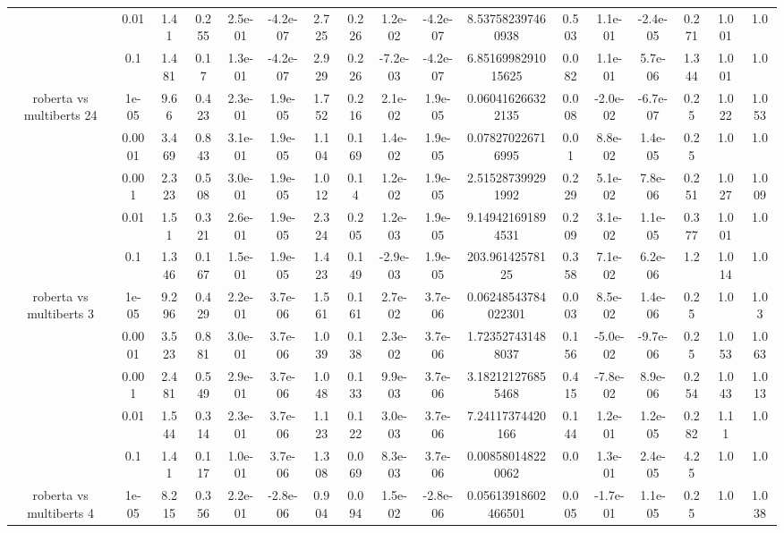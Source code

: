 \begin{tabular}{|c|c|c|c|c|c|c|c|c|c|c|c|c|c|c|c|c|}
 & 0.01 & 1.41 & 0.255 & 2.5e-01 & -4.2e-07 & 2.725 & 0.226 & 1.2e-02 & -4.2e-07 & 8.537582397460938 & 0.503 & 1.1e-01 & -2.4e-05 & 0.271 & 1.001 & 1.0 \\
 & 0.1 & 1.481 & 0.17 & 1.3e-01 & -4.2e-07 & 2.929 & 0.226 & -7.2e-03 & -4.2e-07 & 6.8516998291015625 & 0.082 & 1.1e-01 & 5.7e-06 & 1.344 & 1.001 & 1.0 \\
\hline
\multirow{5}{*}{roberta  vs multiberts 24} & 1e-05 & 9.66 & 0.423 & 2.3e-01 & 1.9e-05 & 1.752 & 0.216 & 2.1e-02 & 1.9e-05 & 0.060416266322135 & 0.008 & -2.0e-02 & -6.7e-07 & 0.25 & 1.022 & 1.053 \\
 & 0.0001 & 3.469 & 0.843 & 3.1e-01 & 1.9e-05 & 1.104 & 0.169 & 1.4e-02 & 1.9e-05 & 0.078270226716995 & 0.01 & 8.8e-02 & 1.4e-05 & 0.25 & 1.0 & 1.0 \\
 & 0.001 & 2.323 & 0.508 & 3.0e-01 & 1.9e-05 & 1.012 & 0.14 & 1.2e-02 & 1.9e-05 & 2.515287399291992 & 0.229 & 5.1e-02 & 7.8e-06 & 0.251 & 1.027 & 1.009 \\
 & 0.01 & 1.51 & 0.321 & 2.6e-01 & 1.9e-05 & 2.324 & 0.205 & 1.2e-03 & 1.9e-05 & 9.149421691894531 & 0.209 & 3.1e-02 & 1.1e-05 & 0.377 & 1.001 & 1.0 \\
 & 0.1 & 1.346 & 0.167 & 1.5e-01 & 1.9e-05 & 1.423 & 0.149 & -2.9e-03 & 1.9e-05 & 203.96142578125 & 0.358 & 7.1e-02 & 6.2e-06 & 1.2 & 1.014 & 1.0 \\
\hline
\multirow{5}{*}{roberta  vs multiberts 3} & 1e-05 & 9.296 & 0.429 & 2.2e-01 & 3.7e-06 & 1.561 & 0.161 & 2.7e-02 & 3.7e-06 & 0.06248543784022301 & 0.003 & 8.5e-02 & 1.4e-06 & 0.25 & 1.0 & 1.03 \\
 & 0.0001 & 3.523 & 0.881 & 3.0e-01 & 3.7e-06 & 1.039 & 0.138 & 2.3e-02 & 3.7e-06 & 1.723527431488037 & 0.156 & -5.0e-02 & -9.7e-06 & 0.25 & 1.053 & 1.063 \\
 & 0.001 & 2.481 & 0.549 & 2.9e-01 & 3.7e-06 & 1.048 & 0.133 & 9.9e-03 & 3.7e-06 & 3.182121276855468 & 0.415 & -7.8e-02 & 8.9e-06 & 0.254 & 1.043 & 1.013 \\
 & 0.01 & 1.544 & 0.314 & 2.3e-01 & 3.7e-06 & 1.123 & 0.122 & 3.0e-03 & 3.7e-06 & 7.24117374420166 & 0.144 & 1.2e-01 & 1.2e-05 & 0.282 & 1.11 & 1.0 \\
 & 0.1 & 1.41 & 0.117 & 1.0e-01 & 3.7e-06 & 1.308 & 0.069 & 8.3e-03 & 3.7e-06 & 0.008580148220062 & 0.0 & 1.3e-01 & 2.4e-05 & 4.25 & 1.0 & 1.0 \\
\hline
\multirow{5}{*}{roberta  vs multiberts 4} & 1e-05 & 8.215 & 0.356 & 2.2e-01 & -2.8e-06 & 0.904 & 0.094 & 1.5e-02 & -2.8e-06 & 0.05613918602466501 & 0.005 & -1.7e-01 & 1.1e-05 & 0.25 & 1.0 & 1.038 \\

\end{tabular}
